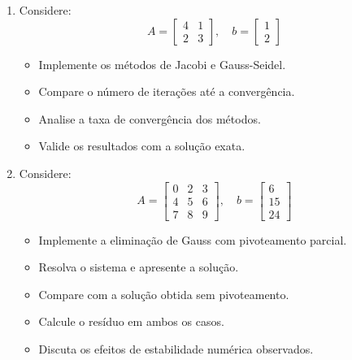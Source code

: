 \begin{enumerate}[label=\thesection.\arabic*]
\begin{itemize}
    \item Implemente o método de Jacobi num \textit{script}.
    \item Utilize um critério de parada baseado em $\|x^{(k+1)} - x^{(k)}\|$.
    \item Determine o número de iterações necessário para convergência.
    \item Compare com a solução obtida via \texttt{numpy.linalg.solve} do python ou similar.
\end{itemize}

\item Considere:
\[
A =
\begin{bmatrix}
4 & 1 \\
2 & 3
\end{bmatrix},
\quad
b =
\begin{bmatrix}
1 \\ 2
\end{bmatrix}
\]

\begin{itemize}
    \item Implemente os métodos de Jacobi e Gauss-Seidel.
    \item Compare o número de iterações até a convergência.
    \item Analise a taxa de convergência dos métodos.
    \item Valide os resultados com a solução exata.
\end{itemize}

\item Considere:
\[
A =
\begin{bmatrix}
0 & 2 & 3 \\
4 & 5 & 6 \\
7 & 8 & 9
\end{bmatrix},
\quad
b =
\begin{bmatrix}
6 \\ 15 \\ 24
\end{bmatrix}
\]

\begin{itemize}
    \item Implemente a eliminação de Gauss com pivoteamento parcial.
    \item Resolva o sistema e apresente a solução.
    \item Compare com a solução obtida sem pivoteamento.
    \item Calcule o resíduo em ambos os casos.
    \item Discuta os efeitos de estabilidade numérica observados.
\end{itemize}

\end{enumerate}

